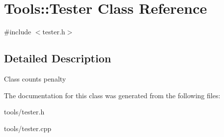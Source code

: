 \hypertarget{classTools_1_1Tester}{\section{Tools\-:\-:Tester Class Reference}
\label{classTools_1_1Tester}
}


{\ttfamily \#include $<$tester.\-h$>$}



\subsection{Detailed Description}
Class counts penalty 

The documentation for this class was generated from the following files\-:\begin{DoxyCompactItemize}
\item 
tools/tester.\-h\item 
tools/tester.\-cpp\end{DoxyCompactItemize}
